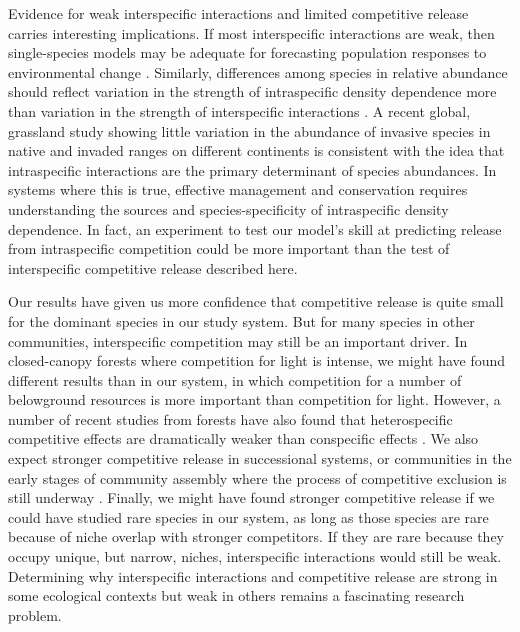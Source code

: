 \documentclass[11pt]{article}
\begin{document}
\begin{doublespacing}
Evidence for weak interspecific interactions and limited competitive release carries interesting implications. If most interspecific interactions are weak, then single-species models may be adequate for forecasting population responses to environmental change \citep{adler_forecasting_2012,kleinhesselink_indirect_2015}. Similarly, differences among species in relative abundance should reflect variation in the strength of intraspecific density dependence more than variation in the strength of interspecific interactions \citep{yenni_strong_2012}. A recent global, grassland study showing little variation in the abundance of invasive species in native and invaded ranges on different continents  \citep{firn_abundance_2011} is consistent with the idea that intraspecific interactions are the primary determinant of species abundances. In systems where this is true, effective management and conservation requires understanding the sources and species-specificity of intraspecific density dependence. In fact, an experiment to test our model's skill at predicting release from intraspecific competition could be more important than the test of interspecific competitive release described here.

Our results have given us more confidence that competitive release is quite small for the dominant species in our study system. But for many species in other communities, interspecific competition may still be an important driver. In closed-canopy forests where competition for light is intense, we might have found different results than in our system, in which competition for a number of belowground resources is more important than competition for light. However, a number of recent studies from forests have also found that heterospecific competitive effects are dramatically weaker than conspecific effects \citep{comita_asymmetric_2010,kunstler_plant_2015,johnson_conspecific_2012}.  We also expect stronger competitive release in successional systems, or communities in the early stages of community assembly where the process of competitive exclusion is still underway \citep{kokkoris_patterns_1999}. Finally, we might have found stronger competitive release if we could have studied rare species in our system, as long as those species are rare because of niche overlap with stronger competitors. If they are rare because they occupy unique, but narrow, niches, interspecific interactions would still be weak. Determining why interspecific interactions and competitive release are strong in some ecological contexts but weak in others remains a fascinating research problem. 
  

\end{doublespacing}
\end{document}
